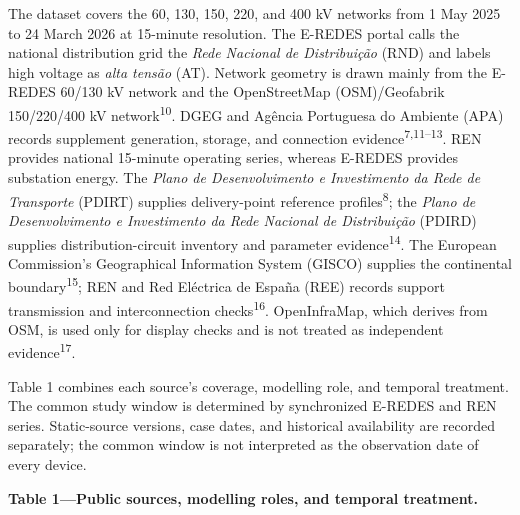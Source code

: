 \documentclass[
  10pt]{article}
\begin{document}
The dataset covers the 60, 130, 150, 220, and 400 kV networks from 1 May
2025 to 24 March 2026 at 15-minute resolution. The E-REDES portal calls
the national distribution grid the \emph{Rede Nacional de Distribuição}
(RND) and labels high voltage as \emph{alta tensão} (AT). Network
geometry is drawn mainly from the E-REDES 60/130 kV network and the
OpenStreetMap (OSM)/Geofabrik 150/220/400 kV
network\textsuperscript{10}. DGEG and Agência Portuguesa do Ambiente
(APA) records supplement generation, storage, and connection
evidence\textsuperscript{7,11--13}. REN provides national 15-minute
operating series, whereas E-REDES provides substation energy. The
\emph{Plano de Desenvolvimento e Investimento da Rede de Transporte}
(PDIRT) supplies delivery-point reference profiles\textsuperscript{8};
the \emph{Plano de Desenvolvimento e Investimento da Rede Nacional de
Distribuição} (PDIRD) supplies distribution-circuit inventory and
parameter evidence\textsuperscript{14}. The European Commission's
Geographical Information System (GISCO) supplies the continental
boundary\textsuperscript{15}; REN and Red Eléctrica de España (REE)
records support transmission and interconnection
checks\textsuperscript{16}. OpenInfraMap, which derives from OSM, is
used only for display checks and is not treated as independent
evidence\textsuperscript{17}.

Table 1 combines each source's coverage, modelling role, and temporal
treatment. The common study window is determined by synchronized E-REDES
and REN series. Static-source versions, case dates, and historical
availability are recorded separately; the common window is not
interpreted as the observation date of every device.


\textbf{Table 1---Public sources, modelling roles, and temporal
treatment.}
\end{document}
